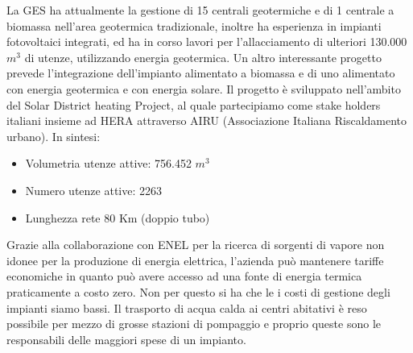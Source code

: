 \documentclass[laurea,oneside,11pt]{USiena_tesiLM}
\begin{document}
La GES ha attualmente la gestione di 15 centrali geotermiche e di 1 centrale a biomassa nell'area geotermica tradizionale, inoltre ha esperienza in impianti fotovoltaici integrati, ed ha in corso lavori per l'allacciamento di ulteriori 130.000 $m^3$ di utenze, utilizzando energia geotermica. Un altro interessante progetto prevede l'integrazione dell'impianto alimentato a biomassa e di uno alimentato con energia geotermica e con energia solare. Il progetto è sviluppato nell'ambito del Solar District heating Project, al quale partecipiamo come stake holders italiani insieme ad HERA attraverso AIRU (Associazione Italiana Riscaldamento urbano).
In sintesi:
\begin{itemize}
\item Volumetria utenze attive: 756.452 $m^3$
\item Numero utenze attive: 2263
\item Lunghezza rete 80 Km (doppio tubo)
\end{itemize}


Grazie alla collaborazione con ENEL per la ricerca di sorgenti di vapore non idonee per la produzione di energia elettrica, l'azienda può  mantenere tariffe economiche in quanto può avere accesso ad una fonte di energia termica praticamente a costo zero. Non per questo si ha che le i costi di gestione degli impianti siamo bassi. Il trasporto di acqua calda ai centri abitativi è reso possibile per mezzo di grosse stazioni di pompaggio e proprio queste sono le responsabili delle maggiori spese di un impianto. 
\end{document}
